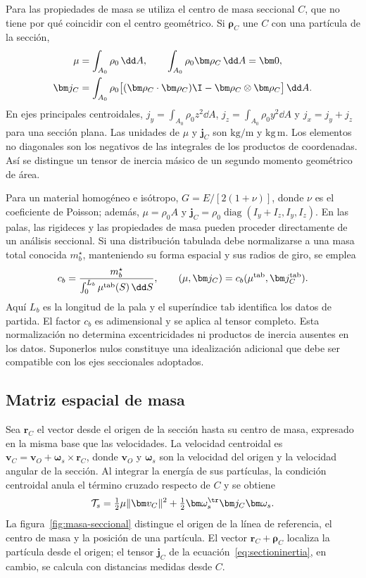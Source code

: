 Para las propiedades de masa se utiliza el centro de masa seccional $C$, que no tiene por qué coincidir con el centro geométrico. Si $\bm\rho_C$ une $C$ con una partícula de la sección,
\begin{align}
\mu&=\int_{A_0}\rho_0\,\dd A,\qquad
\int_{A_0}\rho_0\bm\rho_C\,\dd A=\bm0,\nonumber\\
\bm j_C&=\int_{A_0}\rho_0
\big[(\bm\rho_C\cdot\bm\rho_C)\I-\bm\rho_C\otimes\bm\rho_C\big]\,\dd A.
\label{eq:sectioninertia}
\end{align}
En ejes principales centroidales, $j_y=\int_{A_0}\rho_0 z^2\dd A$, $j_z=\int_{A_0}\rho_0 y^2\dd A$ y $j_x=j_y+j_z$ para una sección plana. Las unidades de $\mu$ y $\bm j_C$ son $\mathrm{kg/m}$ y $\mathrm{kg\,m}$. Los elementos no diagonales son los negativos de las integrales de los productos de coordenadas. Así se distingue un tensor de inercia másico de un segundo momento geométrico de área.

Para un material homogéneo e isótropo, $G=E/[2(1+\nu)]$, donde $\nu$ es el coeficiente de Poisson; además, $\mu=\rho_0 A$ y $\bm j_C=\rho_0\operatorname{diag}(I_y+I_z,I_y,I_z)$. En las palas, las rigideces y las propiedades de masa pueden proceder directamente de un análisis seccional. Si una distribución tabulada debe normalizarse a una masa total conocida $m_b^\star$, manteniendo su forma espacial y sus radios de giro, se emplea
\begin{equation}
c_b=\frac{m_b^\star}{\int_0^{L_b}\mu^{\rm tab}(S)\,\dd S},
\qquad (\mu,\bm j_C)=c_b(\mu^{\rm tab},\bm j_C^{\rm tab}).
\label{eq:massscale}
\end{equation}
Aquí $L_b$ es la longitud de la pala y el superíndice $\mathrm{tab}$ identifica los datos de partida. El factor $c_b$ es adimensional y se aplica al tensor completo. Esta normalización no determina excentricidades ni productos de inercia ausentes en los datos. Suponerlos nulos constituye una idealización adicional que debe ser compatible con los ejes seccionales adoptados.

\subsection{Matriz espacial de masa}
Sea $\bm r_C$ el vector desde el origen de la sección hasta su centro de masa, expresado en la misma base que las velocidades. La velocidad centroidal es $\bm v_C=\bm v_O+\bm\omega_s\times\bm r_C$, donde $\bm v_O$ y $\bm\omega_s$ son la velocidad del origen y la velocidad angular de la sección. Al integrar la energía de sus partículas, la condición centroidal anula el término cruzado respecto de $C$ y se obtiene
\begin{equation}
\mathcal T_s=\tfrac12\mu\|\bm v_C\|^2
+\tfrac12\bm\omega_s^\tr\bm j_C\bm\omega_s.
\label{eq:energia-seccion}
\end{equation}
La figura~\ref{fig:masa-seccional} distingue el origen de la línea de referencia, el centro de masa y la posición de una partícula. El vector $\bm r_C+\bm\rho_C$ localiza la partícula desde el origen; el tensor $\bm j_C$ de la ecuación~\eqref{eq:sectioninertia}, en cambio, se calcula con distancias medidas desde $C$.


